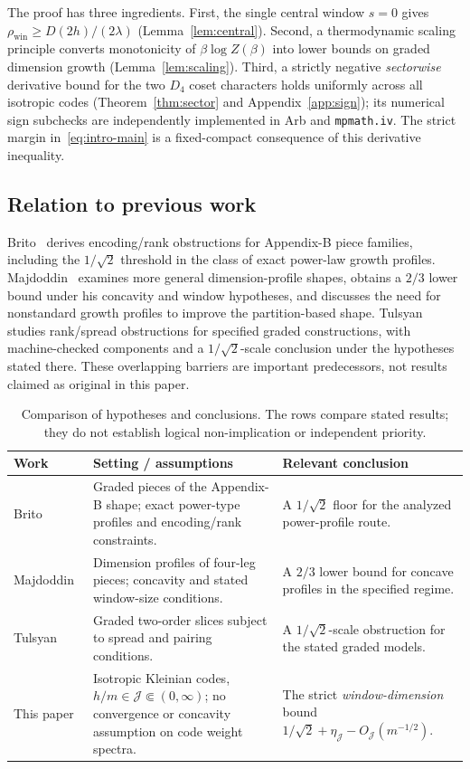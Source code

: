 \documentclass[10pt,a4paper]{article}
\numberwithin{equation}{section}
\theoremstyle{remark}\newtheorem{remark}[theorem]{Remark}\newtheorem{question}[theorem]{Question}
\newcommand{\rhow}{\rho_{\mathrm{win}}}\newcommand{\F}{\mathbb F}\newcommand{\K}{\mathbb K}\newcommand{\Z}{\mathbb Z}\newcommand{\R}{\mathbb R}\newcommand{\cB}{\mathcal L}\newcommand{\wt}{\mathrm{wt}}\newcommand{\dimn}{\operatorname{dim}}\newcommand{\supp}{\operatorname{supp}}
\begin{document}
The proof has three ingredients. First, the single central window
$s=0$ gives $\rhow\ge D(2h)/(2\lambda)$
(Lemma~\ref{lem:central}). Second, a thermodynamic scaling principle
converts monotonicity of $\beta\log Z(\beta)$ into lower bounds on
graded dimension growth (Lemma~\ref{lem:scaling}). Third, a strictly
negative \emph{sectorwise} derivative bound for the two $D_4$ coset
characters holds uniformly across all isotropic codes
(Theorem~\ref{thm:sector} and Appendix~\ref{app:sign}); its numerical
sign subchecks are independently implemented in Arb and
\texttt{mpmath.iv}. The strict margin in~\eqref{eq:intro-main} is a
fixed-compact consequence of this derivative inequality.

\subsection{Relation to previous work}
Brito~\cite{brito} derives encoding/rank obstructions for Appendix-B
piece families, including the $1/\sqrt2$ threshold in the class of
exact power-law growth profiles. Majdoddin~\cite{majdoddin} examines
more general dimension-profile shapes, obtains a $2/3$ lower bound
under his concavity and window hypotheses, and discusses the need for
nonstandard growth profiles to improve the partition-based shape.
Tulsyan~\cite{tulsyan} studies rank/spread obstructions for specified
graded constructions, with machine-checked components and a
$1/\sqrt2$-scale conclusion under the hypotheses stated there.
These overlapping barriers are important predecessors, not results
claimed as original in this paper.

\begin{table}[htbp]
\centering\footnotesize
\renewcommand{\arraystretch}{1.13}
\begin{tabularx}{\linewidth}{@{}p{24mm}X X@{}}
\toprule
Work & Setting / assumptions & Relevant conclusion \\
\midrule
Brito~\cite{brito} & Graded pieces of the Appendix-B shape; exact
power-type profiles and encoding/rank constraints. &
A $1/\sqrt2$ floor for the analyzed power-profile route.\\
Majdoddin~\cite{majdoddin} & Dimension profiles of four-leg pieces;
concavity and stated window-size conditions. &
A $2/3$ lower bound for concave profiles in the specified regime.\\
Tulsyan~\cite{tulsyan} & Graded two-order slices subject to spread
and pairing conditions. &
A $1/\sqrt2$-scale obstruction for the stated graded models.\\
This paper & Isotropic Kleinian codes, $h/m\in\mathcal J\Subset(0,\infty)$;
no convergence or concavity assumption on code weight spectra. &
The strict \emph{window-dimension} bound
$1/\sqrt2+\eta_{\mathcal J}-O_{\mathcal J}(m^{-1/2})$.\\
\bottomrule
\end{tabularx}
\caption{Comparison of hypotheses and conclusions. The rows compare
stated results; they do not establish logical non-implication or
independent priority.}\label{tab:comparison}
\end{table}
\end{document}
